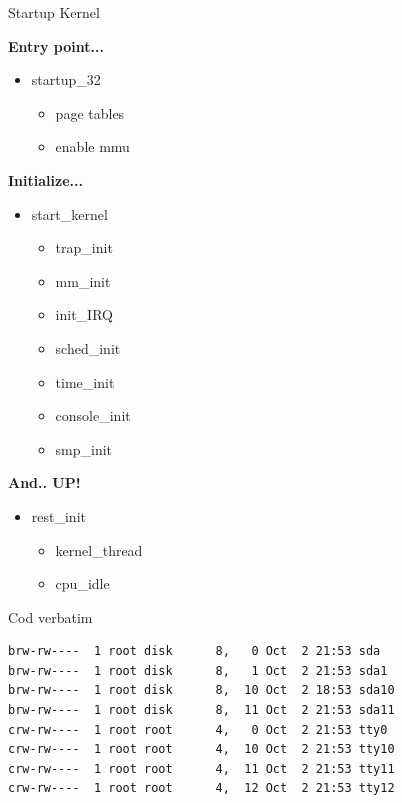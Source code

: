 \documentclass{workshop}
\begin{document}
\begin{frame}{Startup Kernel}

\textbf{Entry point...}\\
\begin{itemize}
\item startup\_32
\begin{itemize}
\item page tables
\item enable mmu
\end{itemize}
\end{itemize}

\textbf{Initialize...}\\
\begin{itemize}
\item start\_kernel
\begin{itemize}
\item trap\_init
\item mm\_init
\item init\_IRQ
\item sched\_init
\item time\_init
\item console\_init
\item smp\_init
\end{itemize}
\end{itemize}

\textbf{And.. UP!}\\
\begin{itemize}
\item rest\_init
\begin{itemize}
\item kernel\_thread
\item cpu\_idle
\end{itemize}
\end{itemize}
\end{frame}


\begin{frame}[fragile]{Cod verbatim}
  \pause
  \footnotesize
  \begin{verbatim}
brw-rw----  1 root disk      8,   0 Oct  2 21:53 sda
brw-rw----  1 root disk      8,   1 Oct  2 21:53 sda1
brw-rw----  1 root disk      8,  10 Oct  2 18:53 sda10
brw-rw----  1 root disk      8,  11 Oct  2 21:53 sda11
crw-rw----  1 root root      4,   0 Oct  2 21:53 tty0
crw-rw----  1 root root      4,  10 Oct  2 21:53 tty10
crw-rw----  1 root root      4,  11 Oct  2 21:53 tty11
crw-rw----  1 root root      4,  12 Oct  2 21:53 tty12
  \end{verbatim}
\end{frame}
\end{document}
